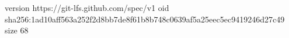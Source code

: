 version https://git-lfs.github.com/spec/v1
oid sha256:1ad10aff563a252f2d8bb7de8f61b8b748c0639af5a25eec5ec9419246d27c49
size 68
